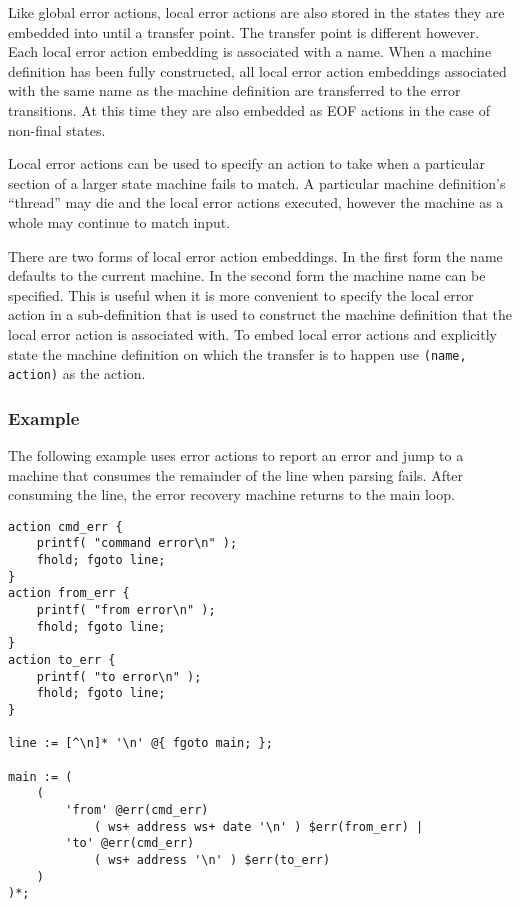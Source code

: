 \documentclass[letterpaper,11pt,oneside]{book}
\newenvironment{inline_code}{\def\baselinestretch{1}\vspace{12pt}\small}{}
\begin{document}
Like global error actions, local error actions are also stored in the states
they are embedded into until a transfer point. The transfer point is different
however. Each local error action embedding is associated with a name. When a
machine definition has been fully constructed, all local error action
embeddings associated with the same name as the machine definition are
transferred to the error transitions. At this time they are also embedded as
EOF actions in the case of non-final states.

Local error actions can be used to specify an action to take when a particular
section of a larger state machine fails to match. A particular machine
definition's ``thread'' may die and the local error actions executed, however
the machine as a whole may continue to match input.

There are two forms of local error action embeddings. In the first form the
name defaults to the current machine. In the second form the machine name can
be specified.  This is useful when it is more convenient to specify the local
error action in a sub-definition that is used to construct the machine
definition that the local error action is associated with. To embed local 
error actions and
explicitly state the machine definition on which the transfer is to happen use
\verb|(name, action)| as the action.

\subsubsection{Example}

The following example uses error actions to report an error and jump to a
machine that consumes the remainder of the line when parsing fails. After
consuming the line, the error recovery machine returns to the main loop.

\begin{inline_code}
\begin{verbatim}
action cmd_err { 
    printf( "command error\n" ); 
    fhold; fgoto line;
}
action from_err { 
    printf( "from error\n" ); 
    fhold; fgoto line; 
}
action to_err { 
    printf( "to error\n" ); 
    fhold; fgoto line;
}

line := [^\n]* '\n' @{ fgoto main; };

main := (
    (
        'from' @err(cmd_err) 
            ( ws+ address ws+ date '\n' ) $err(from_err) |
        'to' @err(cmd_err)
            ( ws+ address '\n' ) $err(to_err)
    ) 
)*;
\end{verbatim}
\end{inline_code}
\end{document}
